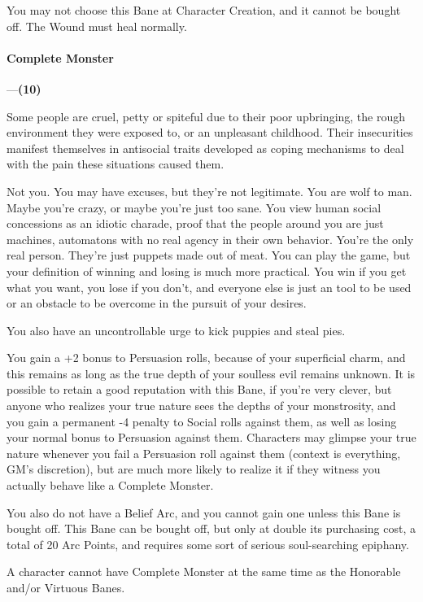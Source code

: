 \documentclass[oneside,11pt,english]{book}
\begin{document}
You may not choose this Bane at Character Creation, and it cannot be bought off. The Wound must heal normally. 
\paragraph{\label{bane:Complete Monster}Complete Monster}---\quad\textbf{(10) }\par
Some people are cruel, petty or spiteful due to their poor upbringing, the rough environment they were 
exposed to, or an unpleasant childhood. Their insecurities manifest themselves in antisocial traits 
developed as coping mechanisms to deal with the pain these situations caused them. 


Not you. You may have excuses, but they're not legitimate. You are wolf to man. Maybe you're crazy, or maybe you're just too sane. You view human social concessions as an idiotic charade, proof that the 
people around you are just machines, automatons with no real agency in their own behavior. You're the 
only real person. They're just puppets made out of meat. You can play the game, but your definition of 
winning and losing is much more practical. You win if you get what you want, you lose if you don't, and 
everyone else is just an tool to be used or an obstacle to be overcome in the pursuit of your desires. 


You also have an uncontrollable urge to kick puppies and steal pies. 


You gain a +2 bonus to Persuasion rolls, because of your superficial charm, and this remains as long as 
the true depth of your soulless evil remains unknown. It is possible to retain a good reputation with this 
Bane, if you're very clever, but anyone who realizes your true nature sees the depths of your monstrosity, 
and you gain a permanent -4 penalty to Social rolls against them, as well as losing your normal bonus to 
Persuasion against them. Characters may glimpse your true nature whenever you fail a Persuasion roll 
against them (context is everything, GM's discretion), but are much more likely to realize it if they 
witness you actually behave like a Complete Monster. 

You also do not have a Belief Arc, and you cannot gain one unless this Bane is
bought off. This Bane can be bought off, but only at double its purchasing cost,
a total of 20 Arc Points, and requires some sort of serious soul-searching epiphany.  


A character cannot have Complete Monster at the same time as the Honorable and/or Virtuous Banes. 
\end{document}
